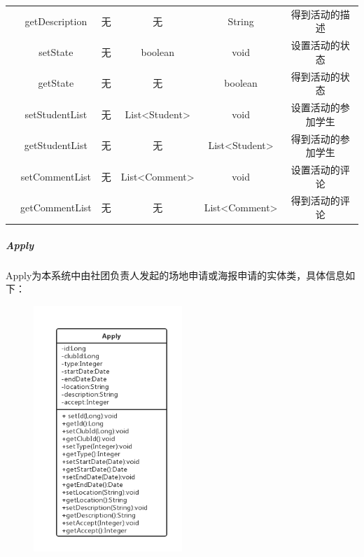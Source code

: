 \documentclass[UTF8]{ctexart}
\begin{document}
\begin{table}[H]
\begin{tabular}{|c|c|c|c|c|c|}
&getDescription & 无 & 无 & String & 得到活动的描述\\
&setState & 无 & boolean & void & 设置活动的状态\\
&getState & 无 & 无 & boolean & 得到活动的状态\\
&setStudentList & 无 & List<Student> & void & 设置活动的参加学生\\
&getStudentList & 无 & 无 & List<Student> & 得到活动的参加学生\\
&setCommentList & 无 & List<Comment> & void & 设置活动的评论\\
&getCommentList & 无 & 无 & List<Comment> & 得到活动的评论\\
\hline
\end{tabular}
\end{table}

\subparagraph{Apply}
Apply为本系统中由社团负责人发起的场地申请或海报申请的实体类，具体信息如下：
\newline
\begin{figure}[H]
\centering
\includegraphics[width = 0.5\textwidth]{apply-class.png}
\end{figure}
\end{document}
